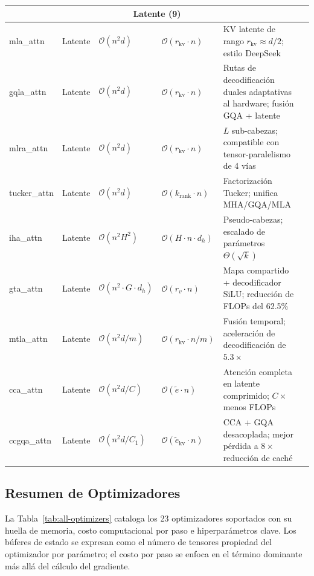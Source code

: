 \begin{longtable}{p{2.0cm}p{1.3cm}p{2.2cm}p{2.2cm}p{4.0cm}p{2.5cm}}
\multicolumn{6}{c}{\textbf{Latente (9)}} \\
\midrule
mla\_attn & Latente & $\mathcal{O}(n^2 d)$ & $\mathcal{O}(r_{\text{kv}} \cdot n)$ & KV latente de rango $r_{\text{kv}} \approx d/2$; estilo DeepSeek & \citep{mehta_mla_2025} \\
gqla\_attn & Latente & $\mathcal{O}(n^2 d)$ & $\mathcal{O}(r_{\text{kv}} \cdot n)$ & Rutas de decodificación duales adaptativas al hardware; fusión GQA + latente & \citep{meng_gqla_2026} \\
mlra\_attn & Latente & $\mathcal{O}(n^2 d)$ & $\mathcal{O}(r_{\text{kv}} \cdot n)$ & $L$ sub-cabezas; compatible con tensor-paralelismo de 4 vías & \citep{liu_mlra_2026} \\
tucker\_attn & Latente & $\mathcal{O}(n^2 d)$ & $\mathcal{O}(k_{\text{rank}} \cdot n)$ & Factorización Tucker; unifica MHA/GQA/MLA & \citep{klein_tucker_2026} \\
iha\_attn & Latente & $\mathcal{O}(n^2 H^2)$ & $\mathcal{O}(H \cdot n \cdot d_h)$ & Pseudo-cabezas; escalado de parámetros $\Theta(\sqrt{k})$ & \citep{duvvuri_iha_2026} \\
gta\_attn & Latente & $\mathcal{O}(n^2 \cdot G \cdot d_h)$ & $\mathcal{O}(r_v \cdot n)$ & Mapa compartido + decodificador SiLU; reducción de FLOPs del 62.5\% & \citep{sun_gta_2025} \\
mtla\_attn & Latente & $\mathcal{O}(n^2 d / m)$ & $\mathcal{O}(r_{\text{kv}} \cdot n / m)$ & Fusión temporal; aceleración de decodificación de $5.3\times$ & \citep{deng_mtla_2025} \\
cca\_attn & Latente & $\mathcal{O}(n^2 d / C)$ & $\mathcal{O}(\tilde{e} \cdot n)$ & Atención completa en latente comprimido; $C\times$ menos FLOPs & \citep{figliola_cca_2025} \\
ccgqa\_attn & Latente & $\mathcal{O}(n^2 d / C_1)$ & $\mathcal{O}(\tilde{e}_{\text{kv}} \cdot n)$ & CCA + GQA desacoplada; mejor pérdida a $8\times$ reducción de caché & \citep{figliola_cca_2025} \\
\bottomrule
\end{longtable}
\normalsize

\subsection{Resumen de Optimizadores}

La Tabla~\ref{tab:all-optimizers} cataloga los 23 optimizadores soportados con su huella de memoria, costo computacional por paso e hiperparámetros clave. Los búferes de estado se expresan como el número de tensores propiedad del optimizador por parámetro; el costo por paso se enfoca en el término dominante más allá del cálculo del gradiente.

